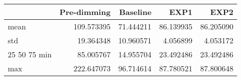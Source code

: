 \begin{tabular}{lrrrr}
\toprule
 & Pre-dimming & Baseline & EXP1 & EXP2 \\
\midrule
mean & 109.573395 & 71.444211 & 86.139935 & 86.205090 \\
std & 19.364348 & 10.960571 & 4.056899 & 4.053172 \\
25%
50%
75%
min & 85.005767 & 14.955704 & 23.492486 & 23.492486 \\
max & 222.647073 & 96.714614 & 87.780521 & 87.800648 \\
\bottomrule
\end{tabular}
